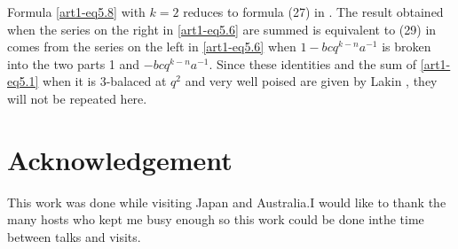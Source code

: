 Formula \eqref{art1-eq5.8} with $k=2$ reduces to formula (27) in \cite{art1-key9}. The result obtained when the series on the right in \eqref{art1-eq5.6} are summed is equivalent to (29) in \cite{art1-key9} comes from the series on the left in \eqref{art1-eq5.6} when $1 - bc q^{k-n} a^{-1}$ is broken into the two parts 1 and $-bcq^{k-n} a^{-1}$. Since these identities and the sum of \eqref{art1-eq5.1} when it is 3-balaced at $q^2$ and very well poised are given by Lakin \cite{art1-key9}, they will not be repeated here. 

\section{Acknowledgement}\label{art1-sec6}
This work was done while visiting Japan and Australia.\pageoriginale I would like to thank the many hosts who kept me busy enough so this work could be done inthe time between talks and visits. 


